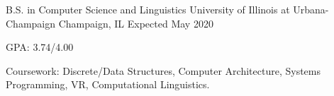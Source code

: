 

\begin{cventries}

  \cventry
    {B.S. in Computer Science and Linguistics} %
    {University of Illinois at Urbana-Champaign} %
    {Champaign, IL} %
    {Expected May 2020} %
    {
      \begin{cvitems} %
        \item {GPA: 3.74/4.00}
        \item {Coursework: Discrete/Data Structures, Computer Architecture, Systems Programming, VR, Computational Linguistics.}%
      \end{cvitems}
    }
    
\end{cventries}

